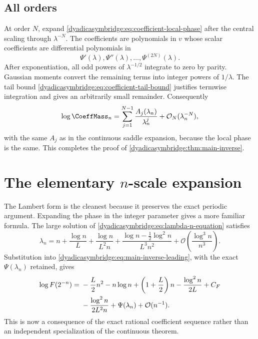 \documentclass[11pt,oneside]{article}
\theoremstyle{definition}
\theoremstyle{remark}
\newcommand{\bigO}{\mathcal O}
\begin{document}
\subsection{All orders}

At order $N$, expand \eqref{dyadicasymbridge:eq:coefficient-local-phase} after the central scaling through
$\lambda^{-N}$.  The coefficients are polynomials in $v$ whose scalar coefficients are differential polynomials in
\begin{equation}
 \Psi'(\lambda),\Psi''(\lambda),\ldots,\Psi^{(2N)}(\lambda).
\end{equation}
After exponentiation, all odd powers of $\lambda^{-1/2}$ integrate to zero by parity.  Gaussian moments convert the remaining terms into integer powers of $1/\lambda$.  The tail bound \eqref{dyadicasymbridge:eq:coefficient-tail-bound} justifies termwise integration and gives an arbitrarily small remainder.  Consequently
\begin{equation}
 \log\CoeffMass_n=
 \sum_{j=1}^{N-1}\frac{A_j(\lambda_n)}{\lambda_n^j}
 +\bigO_N(\lambda_n^{-N}),
\label{dyadicasymbridge:eq:Cn-all-orders}
\end{equation}
with the same $A_j$ as in the continuous saddle expansion, because the local phase is the same.  This completes the proof of \cref{dyadicasymbridge:thm:main-inverse}.

\section{The elementary \texorpdfstring{$n$}{n}-scale expansion}
\label{dyadicasymbridge:sec:n-scale}

The Lambert form is the cleanest because it preserves the exact periodic argument.  Expanding the phase in the integer parameter gives a more familiar formula.  The large solution of
\eqref{dyadicasymbridge:eq:lambda-n-equation} satisfies
\begin{equation}
 \lambda_n=n+\frac{\log n}{L}
 +\frac{\log n}{L^2n}
 +\frac{\log n-\tfrac12\log^2n}{L^3n^2}
 +\bigO\!\left(\frac{\log^3n}{n^3}\right).
\label{dyadicasymbridge:eq:lambda-n-expansion}
\end{equation}
Substitution into \eqref{dyadicasymbridge:eq:main-inverse-leading}, with the exact
$\Psi(\lambda_n)$ retained, gives
\begin{align}
 \log F(2^{-n})
 ={}&-\frac L2n^2-n\log n+
 \left(1+\frac L2\right)n
 -\frac{\log^2n}{2L}+C_F                              \notag\\
 &-\frac{\log^2n}{2L^2n}
 +\Psi(\lambda_n)+\bigO(n^{-1}).
\label{dyadicasymbridge:eq:integer-dyadic-expansion}
\end{align}
This is now a consequence of the exact rational coefficient sequence rather than an independent specialization of the continuous theorem.
\end{document}
